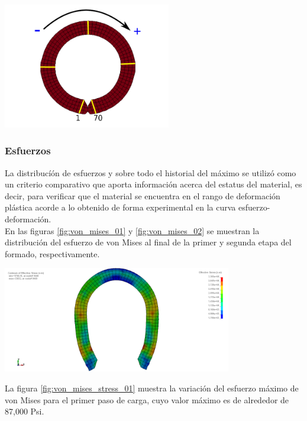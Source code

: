 \begin{center}
\includegraphics[width=0.55\textwidth]{src/ch4/numerate.pdf}
\label{fig:numerate}
\end{center}

\subsubsection{Esfuerzos}

La distribucíón de esfuerzos y sobre todo el historial del máximo se utilizó como 
un criterio comparativo  que aporta información acerca del estatus del material, 
es decir, para verificar que el material se encuentra en el rango de deformación 
plástica acorde a lo obtenido de forma experimental en la curva esfuerzo-deformación.\\

En las figuras \ref{fig:von_mises_01} y \ref{fig:von_mises_02} se muestran la 
distribución del esfuerzo de von Mises al final de la primer y segunda etapa 
del formado, respectivamente. 

\begin{center}
\includegraphics[width=0.75\textwidth]{src/ch4/von_mises_01.png}
\label{fig:von_mises_01}
\end{center}

La figura \ref{fig:von_mises_stress_01} muestra la variación del esfuerzo máximo 
de von Mises para el primer paso de carga, cuyo valor máximo es de alrededor de 87,000 Psi.

